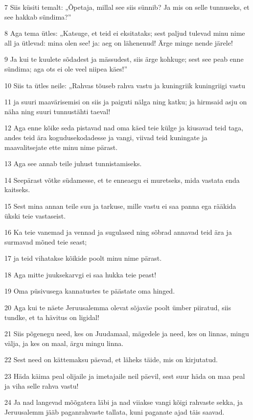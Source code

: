\par 7 Siis küsiti temalt: „Õpetaja, millal see siis sünnib? Ja mis on selle tunnuseks, et see hakkab sündima?”
\par 8 Aga tema ütles: „Katsuge, et teid ei eksitataks; sest paljud tulevad minu nime all ja ütlevad: mina olen see! ja: aeg on lähenenud! Ärge minge nende järele!
\par 9 Ja kui te kuulete sõdadest ja mässudest, siis ärge kohkuge; sest see peab enne sündima; aga ots ei ole veel niipea käes!”
\par 10 Siis ta ütles neile: „Rahvas tõuseb rahva vastu ja kuningriik kuningriigi vastu
\par 11 ja suuri maavärisemisi on siis ja paiguti nälga ning katku; ja hirmsaid asju on näha ning suuri tunnustähti taeval!
\par 12 Aga enne kõike seda pistavad nad oma käed teie külge ja kiusavad teid taga, andes teid ära kogudusekodadesse ja vangi, viivad teid kuningate ja maavalitsejate ette minu nime pärast.
\par 13 Aga see annab teile juhust tunnistamiseks.
\par 14 Seepärast võtke südamesse, et te enneaegu ei muretseks, mida vastata enda kaitseks.
\par 15 Sest mina annan teile suu ja tarkuse, mille vastu ei saa panna ega rääkida ükski teie vastaseist.
\par 16 Ka teie vanemad ja vennad ja sugulased ning sõbrad annavad teid ära ja surmavad mõned teie seast;
\par 17 ja teid vihatakse kõikide poolt minu nime pärast.
\par 18 Aga mitte juuksekarvgi ei saa hukka teie peast!
\par 19 Oma püsivusega kannatustes te päästate oma hinged.
\par 20 Aga kui te näete Jeruusalemma olevat sõjaväe poolt ümber piiratud, siis tundke, et ta hävitus on ligidal!
\par 21 Siis põgenegu need, kes on Juudamaal, mägedele ja need, kes on linnas, mingu välja, ja kes on maal, ärgu mingu linna.
\par 22 Sest need on kättemaksu päevad, et läheks täide, mis on kirjutatud.
\par 23 Häda käima peal olijaile ja imetajaile neil päevil, sest suur häda on maa peal ja viha selle rahva vastu!
\par 24 Ja nad langevad mõõgatera läbi ja nad viiakse vangi kõigi rahvaste sekka, ja Jeruusalemm jääb paganrahvaste tallata, kuni paganate ajad täis saavad.

